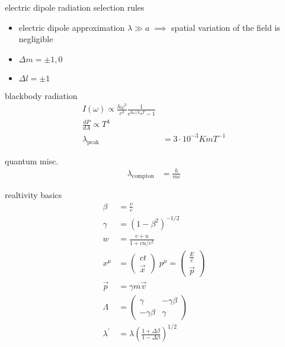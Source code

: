 \documentclass[avery5388, frame]{flashcards}
\begin{document}
\begin{flashcard}{electric dipole radiation selection rules}
  {
    \begin{itemize}
    \item electric dipole approximation $\lambda \gg a \; \implies$ spatial variation of the field is negligible
    \item $\Delta m = \pm 1, 0$
    \item $\Delta l = \pm 1$
    \end{itemize}
  }
\end{flashcard}

\begin{flashcard}{blackbody radiation}
  {
    \begin{align*}
      I(\omega) \propto \frac{h \omega^{3}}{c^{2}} \frac{1}{e^{\hbar \omega / k_{B} T} - 1}\\
      \frac{dP}{dA} \propto T^{4}\\
      \lambda_{\textrm{peak}} &= 3 \cdot 10^{-3} K m T^{-1}
    \end{align*}
  }
\end{flashcard}

\begin{flashcard}{quantum misc.}
  {
    \begin{align*}
      \lambda_{\textrm{compton}} &= \frac{h}{mc}
    \end{align*}
  }
\end{flashcard}


\begin{flashcard}{realtivity basics}
  {
    \begin{align*}
      \beta &= \frac{v}{c}\\
      \gamma &= (1 - \beta^{2})^{-1/2}\\
      w &= \frac{v + u}{1 + vu/c^{2}}\\
      x^{\mu} &= \begin{pmatrix} ct\\ \vec{x} \end{pmatrix} \; p^{\mu} = \begin{pmatrix} \frac{E}{c}\\ \vec{p} \end{pmatrix}\\
      \vec{p} &= \gamma m \vec{v}\\
      \Lambda &= \begin{pmatrix} \gamma & -\gamma \beta\\ -\gamma \beta & \gamma \end{pmatrix}\\
      \lambda^{'} &= \lambda (\frac{1 + \Delta \beta}{1 - \Delta \beta})^{1/2}
    \end{align*}
  }
\end{flashcard}
\end{document}
